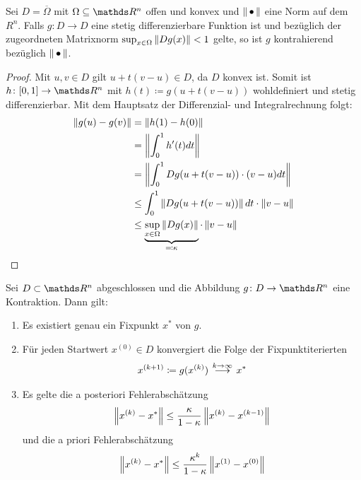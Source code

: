 \begin{Leme}
  \label{5.2.3}
  Sei $D=\overline{\Omega} $ mit $\Omega \subseteq \R^n$ offen und konvex
  und $\nn$ eine Norm auf dem $R^n$.
  Falls $g\colon D\to D$ eine stetig differenzierbare Funktion ist und
  bezüglich der zugeordneten Matrixnorm $\sup_{x\in \Omega}\nn[Dg(x)]<1$ gelte,
  so ist $g$ kontrahierend bezüglich $\nn$.
\end{Leme} 

\begin{proof}
  Mit $u,v \in D$ gilt $u+t(v-u)\in D$, da $D$ konvex ist.
  Somit ist $h\colon [0,1]\to \R^n$ 
  mit $h(t) \coloneqq g(u+t(v-u))$ wohldefiniert
  und stetig differenzierbar.
  Mit dem Hauptsatz der Differenzial- und Integralrechnung folgt:
  \begin{align}\nonumber
    \nn[g(u)-g(v)] 
    & = \nn[h(1)-h(0)]  \\ \nonumber
    & = \nn[\int_{0}^{1} h'(t) dt] \\ \nonumber
    & = \nn[\int_{0}^{1} Dg(u+t(v-u))\cdot (v-u)dt] \\ \nonumber
    & \leq \int_{0}^{1} \nn[Dg(u+t(v-u))]dt \cdot \nn[v-u] \\
    & \leq \underbrace{\sup_{x\in\Omega}\nn[Dg(x)]}_{\eqqcolon \kappa} 
      \cdot \nn[v-u]
      \label{V.2.4}
  \end{align}
\end{proof}

\begin{Satze}
  \label{5.2.4}
  Sei $D\subset \R^n$ abgeschlossen und die Abbildung 
  $g\colon D\to \R^n$  eine Kontraktion.
  Dann gilt:
  \begin{enumerate}[1)]
  \item Es existiert genau ein Fixpunkt $x^{*}$ von $g$.
  \item Für jeden Startwert $x^{(0)}\in D$ konvergiert die 
    Folge der Fixpunktiterierten
    \begin{gather}
      x^{(k+1)} \coloneqq g(x^{(k)})  ~
      \overset{\mathclap{k\rightarrow \infty}}{\longrightarrow}~ x^{*}
      \label{V.2.5}
    \end{gather}
  \item Es gelte die a posteriori Fehlerabschätzung
    \begin{gather}
      \nn[x^{(k)}-x^{*}] \leq \frac{\kappa}{1-\kappa} \nn[x^{(k)}-x^{(k-1)}]
      \label{V.2.6}
    \end{gather}
    und die a priori Fehlerabschätzung
    \begin{gather}
      \nn[x^{(k)}-x^{*}] \leq \frac{\kappa^k}{1-\kappa} \nn[x^{(1)}-x^{(0)} ]
      \label{V.2.7}
    \end{gather}
  \end{enumerate}
\end{Satze}

